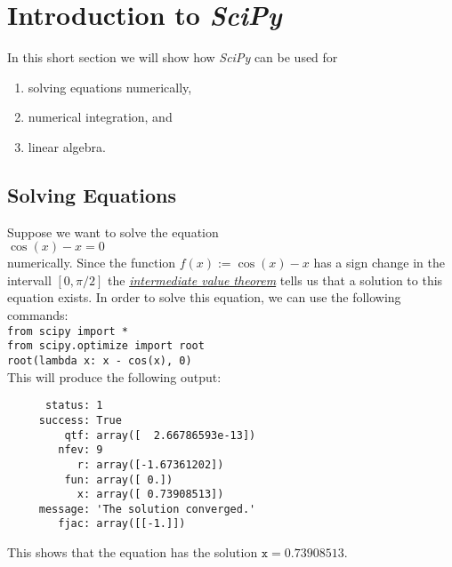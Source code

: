 \documentclass{article}
\begin{document}
\section{Introduction to \textsl{SciPy}}
In this short section we will show how \textsl{SciPy} can be used for
\begin{enumerate}
\item solving equations numerically, 
\item numerical integration, and
\item linear algebra.
\end{enumerate}

\subsection{Solving Equations}
Suppose we want to solve the equation
\\[0.2cm]
\hspace*{1.3cm}
$\cos(x) - x = 0$
\\[0.2cm]
numerically.  Since the function $f(x) := \cos(x) - x$ has a sign change in the intervall $[0,\pi/2]$ the 
\href{http://en.wikipedia.org/wiki/Intermediate_value_theorem}{\emph{intermediate value theorem}}
tells us that a solution to this equation exists.  In order to solve this equation, we can use the
following commands:
\\[0.2cm]
\hspace*{1.3cm}
\texttt{from scipy import *} \\
\hspace*{1.3cm}
\texttt{from scipy.optimize import root} \\
\hspace*{1.3cm}
\texttt{root(lambda x: x - cos(x), 0)}
\\[0.2cm]
This will produce the following output:
\begin{verbatim}
      status: 1
     success: True
         qtf: array([  2.66786593e-13])
        nfev: 9
           r: array([-1.67361202])
         fun: array([ 0.])
           x: array([ 0.73908513])
     message: 'The solution converged.'
        fjac: array([[-1.]])
\end{verbatim}
This shows that the equation has the solution $\mathtt{x} = 0.73908513$.
\end{document}
